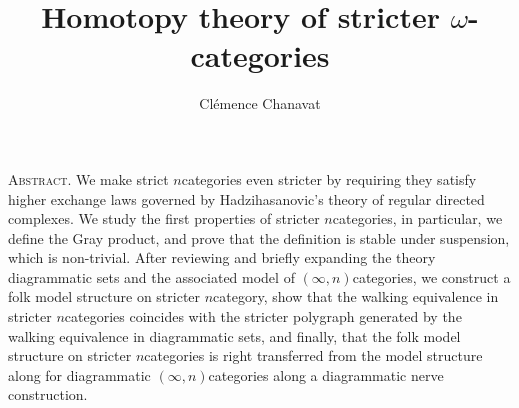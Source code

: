 \documentclass[11pt,twoside]{article}
\title{Homotopy theory of stricter $\omega$-categories}
\author{Cl\'emence Chanavat}
\begin{document}
\maketitle
\begin{center}
	\begin{minipage}[t]{.95\textwidth}
		\small\textsc{Abstract.}
		We make strict \( n \)\nbd categories even stricter by requiring they satisfy higher exchange laws governed by Hadzihasanovic's theory of regular directed complexes. 
		We study the first properties of stricter \( n \)\nbd categories, in particular, we define the Gray product, and prove that the definition is stable under suspension, which is non-trivial. 
		After reviewing and briefly expanding the theory diagrammatic sets and the associated model of \( (\infty, n) \)\nbd categories, we construct a folk model structure on stricter \( n \)\nbd category, show that the walking equivalence in stricter \( n \)\nbd categories coincides with the stricter polygraph generated by the walking equivalence in diagrammatic sets, and finally, that the folk model structure on stricter \( n \)\nbd categories is right transferred from the model structure along for diagrammatic \( (\infty, n) \)\nbd categories along a diagrammatic nerve construction.
	\end{minipage}
	
	\vspace{20pt}

	\begin{minipage}[t]{0.95\textwidth}
		\setcounter{tocdepth}{2}
		\tableofcontents
	\end{minipage}
\end{center}

\makeaftertitle








\small
\end{document}

